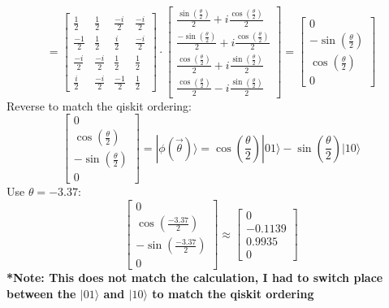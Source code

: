 \documentclass{article}
\begin{document}
\begin{equation}
	\label{eq:1}
	=
	\begin{bmatrix}
		\frac{1}{2}  & \frac{1}{2}  & \frac{-i}{2} & \frac{-i}{2} \\
		\frac{-1}{2} & \frac{1}{2}  & \frac{i}{2}  & \frac{-i}{2} \\
		\frac{-i}{2} & \frac{-i}{2} & \frac{1}{2}  & \frac{1}{2}  \\
		\frac{i}{2}  & \frac{-i}{2} & \frac{-1}{2} & \frac{1}{2}
	\end{bmatrix}
	\cdot
	\begin{bmatrix}
		\frac{\sin \left(\frac{\theta}{2}\right)}{2} + i \frac{\cos \left(\frac{\theta}{2}\right)}{2}  \\
		\frac{-\sin \left(\frac{\theta}{2}\right)}{2} + i \frac{\cos \left(\frac{\theta}{2}\right)}{2} \\
		\frac{\cos \left(\frac{\theta}{2}\right)}{2} + i \frac{\sin \left(\frac{\theta}{2}\right)}{2}  \\
		\frac{\cos \left(\frac{\theta}{2}\right)}{2} - i \frac{\sin \left(\frac{\theta}{2}\right)}{2}
	\end{bmatrix}
	=\begin{bmatrix}
		0                        \\
		- \sin(\frac{\theta}{2}) \\
		\cos(\frac{\theta}{2})   \\
		0
	\end{bmatrix}
\end{equation}
Reverse to match the qiskit ordering:
\begin{equation*}
	\begin{bmatrix}
		0                        \\
		\cos(\frac{\theta}{2})   \\
		- \sin(\frac{\theta}{2}) \\
		0
	\end{bmatrix}
	= |\phi(\vec{\theta}) \rangle = \cos\left(\frac{\theta}{2}\right) |01\rangle - \sin\left(\frac{\theta}{2}\right) |10\rangle
\end{equation*}
Use \(\theta = -3.37\):
\begin{equation*}
	\begin{bmatrix}
		0                       \\
		\cos(\frac{-3.37}{2})   \\
		- \sin(\frac{-3.37}{2}) \\
		0
	\end{bmatrix}
	\approx
	\begin{bmatrix}
		0       \\
		-0.1139 \\
		0.9935  \\
		0
	\end{bmatrix}
\end{equation*}
\textbf{*Note: This does not match the calculation, I had to switch place between the \(|01\rangle\) and \(|10\rangle\) to match the qiskit ordering}
\end{document}
